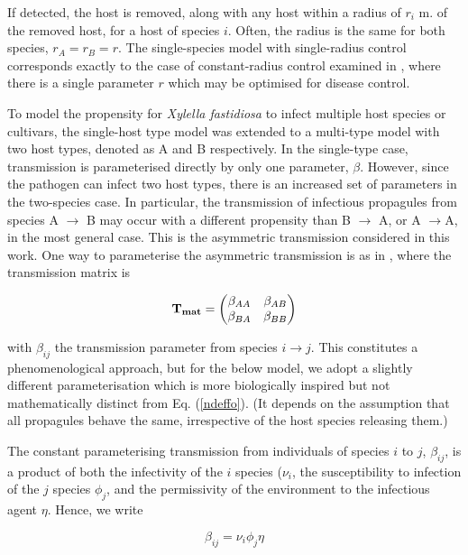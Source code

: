 \documentclass[11pt,letterpaper]{article}
\begin{document}
If detected, the host is removed, along with any host within a radius of $r_{i}$ m. of the removed host, for a host of species $i$. Often, the radius is the same for both species, $r_{A} = r_{B} = r$.
The single-species model with single-radius control corresponds exactly to the case of constant-radius control examined in \cite{HyattTwynam2017}, where there is a single parameter $r$ which may be optimised for disease control.

To model the propensity for \emph{Xylella fastidiosa} to infect multiple host species or cultivars, the single-host type model was extended to a multi-type model with two host types, denoted as A and B respectively. In the single-type case, transmission is parameterised directly by only one parameter, $\beta$. However, since the pathogen can infect two host types, there is an increased set of parameters in the two-species case. In particular, the transmission of infectious propagules from species A $\rightarrow$ B may occur with a different propensity than B $\rightarrow$ A, or A $\rightarrow $A, in the most general case. This is the asymmetric transmission considered in this work. One way to parameterise the asymmetric transmission is as in \cite{NdeffoMbah2010}, where the transmission matrix is 

\begin{equation}
\label{ndeffo}
\bf{T_{mat}} = 
\begin{pmatrix}
\beta_{AA} & \beta_{AB} \\
\beta_{BA} & \beta_{BB}
\end{pmatrix} 
\end{equation}

with $\beta_{ij}$ the transmission parameter from species $i \rightarrow j$. This constitutes a phenomenological approach, but for the below model, we adopt a slightly different parameterisation which is more biologically inspired but not mathematically distinct from Eq. (\ref{ndeffo}). (It depends on the assumption that all propagules behave the same, irrespective of the host species releasing them.) 

The constant parameterising transmission from individuals of species $i$ to $j$, $\beta_{ij}$, is a product of both the infectivity of the $i$ species ($\nu_{i}$, the susceptibility to infection of the $j$ species $\phi_{j}$, and the permissivity of the environment to the infectious agent $\eta$. Hence, we write

\begin{equation}
\beta_{ij} = \nu_{i} \phi_{j} \eta
\end{equation}
\end{document}

